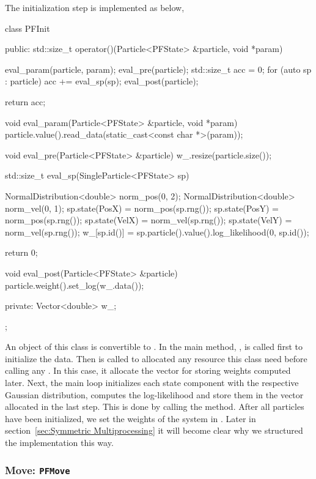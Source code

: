 The initialization step is implemented as below,
\begin{cppcode}
  class PFInit
  {
      public:
      std::size_t operator()(Particle<PFState> &particle, void *param)
      {
          eval_param(particle, param);
          eval_pre(particle);
          std::size_t acc = 0;
          for (auto sp : particle)
              acc += eval_sp(sp);
          eval_post(particle);

          return acc;
      }

      void eval_param(Particle<PFState> &particle, void *param)
      {
          particle.value().read_data(static_cast<const char *>(param));
      }

      void eval_pre(Particle<PFState> &particle)
      {
          w_.resize(particle.size());
      }

      std::size_t eval_sp(SingleParticle<PFState> sp)
      {
          NormalDistribution<double> norm_pos(0, 2);
          NormalDistribution<double> norm_vel(0, 1);
          sp.state(PosX) = norm_pos(sp.rng());
          sp.state(PosY) = norm_pos(sp.rng());
          sp.state(VelX) = norm_vel(sp.rng());
          sp.state(VelY) = norm_vel(sp.rng());
          w_[sp.id()] = sp.particle().value().log_likelihood(0, sp.id());

          return 0;
      }

      void eval_post(Particle<PFState> &particle)
      {
          particle.weight().set_log(w_.data());
      }

      private:
      Vector<double> w_;
  };
\end{cppcode}
An object of this class is convertible to
. In the main method,
,  is called first to initialize
the data. Then  is called to allocated any resource this
class need before calling any . In this case, it allocate
the vector  for storing weights computed later. Next, the main
loop initializes each state component with the respective Gaussian
distribution, computes the log-likelihood and store them in the vector
allocated in the last step. This is done by calling the 
method. After all particles have been initialized, we set the weights of the
system in . Later in section~\ref{sec:Symmetric
  Multiprocessing} it will become clear why we structured the implementation
this way.

\subsubsection{Move: \texttt{PFMove}}

